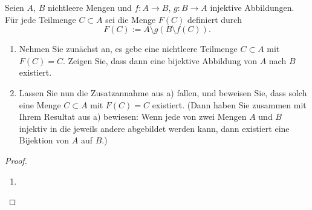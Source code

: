 \documentclass{../problemset}
\begin{document}
\pagebreak

\begin{problem}
Seien $A$, $B$ nichtleere Mengen und $f : A \to B$, $g : B \to A$ injektive Abbildungen. Für jede Teilmenge $C \subset A$ sei die Menge $F(C)$ definiert durch
\[ F(C) := A \setminus g(B \setminus f(C)). \]

\begin{enumerate}
	\item Nehmen Sie zunächst an, es gebe eine nichtleere Teilmenge $C \subset A$ mit $F(C) = C$. Zeigen Sie, dass dann eine bijektive Abbildung von $A$ nach $B$ existiert.
	\item Lassen Sie nun die Zusatzannahme aus a) fallen, und beweisen Sie, dass solch eine Menge $C \subset A$ mit $F(C) = C$ existiert. (Dann haben Sie zusammen mit Ihrem Resultat aus a) bewiesen: Wenn jede von zwei Mengen $A$ und $B$ injektiv in die jeweils andere abgebildet werden kann, dann existiert eine Bijektion von $A$ auf $B$.)
\end{enumerate}

\begin{proof}
	\begin{enumerate}
		\item
	\end{enumerate}
\end{proof}
\end{problem}
\end{document}
